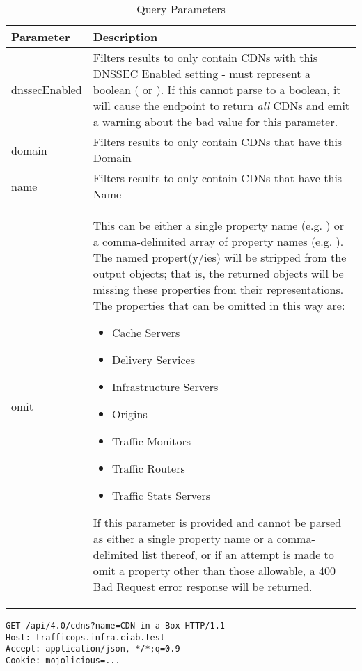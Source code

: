 \begin{table}
	\centering
	\caption{ Query Parameters}
	\begin{tabularx}{\linewidth}{|l|X|}
		\hline
		\textbf{Parameter} & \textbf{Description}\\
		\hline
		dnssecEnabled & Filters results to only contain CDNs with this DNSSEC
			Enabled setting - must represent a boolean (\code{true} or
			\code{false}). If this cannot parse to a boolean, it will cause the
			endpoint to return \emph{all} CDNs and emit a warning about the bad
			value for this parameter.\\
		\hline
		domain & Filters results to only contain CDNs that have this Domain\\
		\hline
		name & Filters results to only contain CDNs that have this Name\\
		\hline
		omit & This can be either a single property name (e.g.
			\code{omit=cacheServers}) or a comma-delimited array of property
			names (e.g. \code{omit=trafficMonitors,trafficRouters}). The named
			propert(y/ies) will be stripped from the output objects; that is,
			the returned objects will be missing these properties from their
			representations. The properties that can be omitted in this way
			are:
			\begin{itemize}
				\item Cache Servers
				\item Delivery Services
				\item Infrastructure Servers
				\item Origins
				\item Traffic Monitors
				\item Traffic Routers
				\item Traffic Stats Servers
			\end{itemize}
			If this parameter is provided and cannot be parsed as either a
			single property name or a comma-delimited list thereof, or if an
			attempt is made to omit a property other than those allowable, a
			400 Bad Request error response will be returned.\\
		\hline
	\end{tabularx}
\end{table}

\begin{codelisting}
\begin{verbatim}
GET /api/4.0/cdns?name=CDN-in-a-Box HTTP/1.1
Host: trafficops.infra.ciab.test
Accept: application/json, */*;q=0.9
Cookie: mojolicious=...

\end{verbatim}
\end{codelisting}

